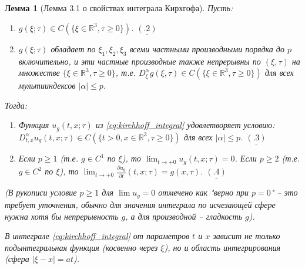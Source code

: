 \documentclass[12pt, a4paper]{article}
\newcommand{\R}{\mathbb{R}}
\newtheorem{lemma}[theorem]{Лемма}
\begin{document}
\begin{lemma}[Лемма 3.1 о свойствах интеграла Кирхгофа]
\label{lem:kirchhoff_properties}
Пусть:
\begin{enumerate}
    \item $g(\xi; \tau) \in C(\{\xi \in \R^3, \tau \ge 0\})$. \quad $\underline{(.2)}$
    \item $g(\xi; \tau)$ обладает по $\xi_1, \xi_2, \xi_3$ всеми частными производными порядка до $p$ включительно, и эти частные производные также непрерывны по $(\xi, \tau)$ на множестве $\{\xi \in \R^3, \tau \ge 0\}$, т.е. $D_\xi^\alpha g(\xi, \tau) \in C(\{\xi \in \R^3, \tau \ge 0\})$ для всех мультииндексов $|\alpha| \le p$.
\end{enumerate}
Тогда:
\begin{enumerate}
    \item Функция $u_g(t,x;\tau)$ из \eqref{eq:kirchhoff_integral} удовлетворяет условию: $D_{t,x}^\alpha u_g(t,x;\tau) \in C(\{t>0, x \in \R^3, \tau \ge 0\})$ для всех $|\alpha| \le p$. \quad $\underline{(.3)}$
    \item Если $p \ge 1$ (т.е. $g \in C^1$ по $\xi$), то $\lim_{t \to +0} u_g(t,x;\tau) = 0$.
          Если $p \ge 2$ (т.е. $g \in C^2$ по $\xi$), то $\lim_{t \to +0} \frac{\partial u_g}{\partial t}(t,x;\tau) = g(x,\tau)$. \quad $\underline{(.4)}$
\end{enumerate}
(В рукописи условие $p \ge 1$ для $\lim u_g = 0$ отмечено как "верно при $p=0$" -- это требует уточнения, обычно для значения интеграла по исчезающей сфере нужна хотя бы непрерывность $g
$, а для производной -- гладкость $g$).

В интеграле \eqref{eq:kirchhoff_integral} от параметров $t$ и $x$ зависит не только подынтегральная функция (косвенно через $\xi$), но и область интегрирования (сфера $|\xi-x|=at$).
\end{lemma}
\end{document}
